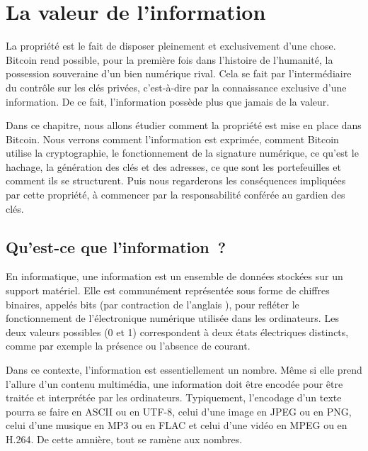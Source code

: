 
\chapter{La valeur de l'information}
\label{ch:propriete}

La propriété est le fait de disposer pleinement et exclusivement d'une chose. Bitcoin rend possible, pour la première fois dans l'histoire de l'humanité, la possession souveraine d'un bien numérique rival. Cela se fait par l'intermédiaire du contrôle sur les clés privées, c'est-à-dire par la connaissance exclusive d'une information. De ce fait, l'information possède plus que jamais de la valeur.

Dans ce chapitre, nous allons étudier comment la propriété est mise en place dans Bitcoin. Nous verrons comment l'information est exprimée, comment Bitcoin utilise la cryptographie, le fonctionnement de la signature numérique, ce qu'est le hachage, la génération des clés et des adresses, ce que sont les portefeuilles et comment ils se structurent. Puis nous regarderons les conséquences impliquées par cette propriété, à commencer par la responsabilité conférée au gardien des clés.

\section*{Qu'est-ce que l'information~?}


En informatique, une information est un ensemble de données stockées sur un support matériel. Elle est communément représentée sous forme de chiffres binaires, appelés bits (par contraction de l'anglais ), pour refléter le fonctionnement de l'électronique numérique utilisée dans les ordinateurs. Les deux valeurs possibles (0 et 1) correspondent à deux états électriques distincts, comme par exemple la présence ou l'absence de courant. %

Dans ce contexte, l'information est essentiellement un nombre. Même si elle prend l'allure d'un contenu multimédia, une information doit être encodée pour être traitée et interprétée par les ordinateurs. Typiquement, l'encodage d'un texte pourra se faire en ASCII ou en UTF-8, celui d'une image en JPEG ou en PNG, celui d'une musique en MP3 ou en FLAC et celui d'une vidéo en MPEG ou en H.264. De cette amnière, tout se ramène aux nombres.

